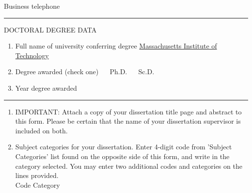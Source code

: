 \documentclass[9pt]{article}
\def\degreeyear{}
\def\codeone{}
\def\categoryone{}
\def\codetwo{}
\newcommand{\TextFieldDefault}[2][]{%
  \raisebox{\dimexpr\depth-\fontchardp\font`y}{%
    \TextField[bordercolor={},backgroundcolor={},#1]{#2}%
  }%
}
\newcommand{\CheckBoxDefault}[2][]{%
  \raisebox{\dimexpr\depth-\fontchardp\font`y}{%
    \CheckBox[bordercolor={0 0 0},backgroundcolor={},#1]{#2}%
  }%
}
\begin{document}
\begin{Form}
\begin{enumerate}
  Business telephone \uline{\usebox{\tempfieldbox}}
\end{enumerate}
\vspace*{0.5\baselineskip} \hrule \vspace*{\baselineskip}
DOCTORAL DEGREE DATA
\begin{enumerate}[resume]
\item
  Full name of university conferring degree \hspace*{.25in} \underline{Massachusetts Institute of Technology}
\item
  \def\phdV{}%
  \def\scdV{}%
  \ifthenelse{\boolean{phd}}{\def\phdV{checked=true}}{}%
  \ifthenelse{\boolean{scd}}{\def\scdV{checked=true}}{}%
  Degree awarded (check one)
  ~~\expandafter\CheckBoxDefault\expandafter[\phdV,name=degree phd,width=\baselineskip,height=\baselineskip]{} Ph.D.
  ~~\expandafter\CheckBoxDefault\expandafter[\scdV,name=degree scd,width=\baselineskip,height=\baselineskip]{} Sc.D.
\item
  \sbox{\tempfieldbox}{\TextFieldDefault[value=\degreeyear,name=degree year,width=1in,height=\baselineskip]{}}%
  Year degree awarded \uline{\usebox{\tempfieldbox}}
\end{enumerate}
\vspace*{0.5\baselineskip} \hrule \vspace*{0.5\baselineskip}
\begin{enumerate}[resume]
\item
  IMPORTANT: Attach a copy of your dissertation title page and abstract to this form. Please be certain that the
  name of your dissertation supervisor is included on both.
\item
  Subject categories for your dissertation. Enter 4-digit code from 'Subject Categories' list found on the opposite side of
  this form, and write in the category selected. You may enter two additional codes and categories on the lines provided. \\
  \sbox{\tempfieldbox}{\TextFieldDefault[value=\codeone,name=code 1,width=.75in,height=\baselineskip]{}}%
  Code \uline{\hspace*{0.125in}\usebox{\tempfieldbox}\hspace*{0.125in}} \qquad
  \sbox{\tempfieldbox}{\TextFieldDefault[value=\categoryone,name=category 1,width=2.375in,height=\baselineskip]{}}%
  Category \uline{\hspace*{0.125in}\usebox{\tempfieldbox}} \\
  \sbox{\tempfieldbox}{\TextFieldDefault[value=\codetwo,name=code 2,width=.75in,height=\baselineskip]{}}%

\end{enumerate}
\end{Form}
\end{document}
